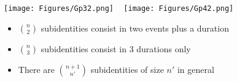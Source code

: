 \documentclass[20pt]{beamer}
\begin{document}

\begin{frame}[plain]
\begin{center}
\Large
\texttt{[image: Figures/Gp32.png]} ~
\texttt{[image: Figures/Gp42.png]} 
\begin{itemize}[<+->]
  \item $\binom{n}{2}$ subidentities consist in two events plus a duration
  \item $\binom{n}{3}$ subidentities consist in 3 durations only
  \item There are $\binom{n+1}{n'}$ subidentities of size $n'$ in general
\end{itemize}

\end{center}

\end{frame}
\end{document}
